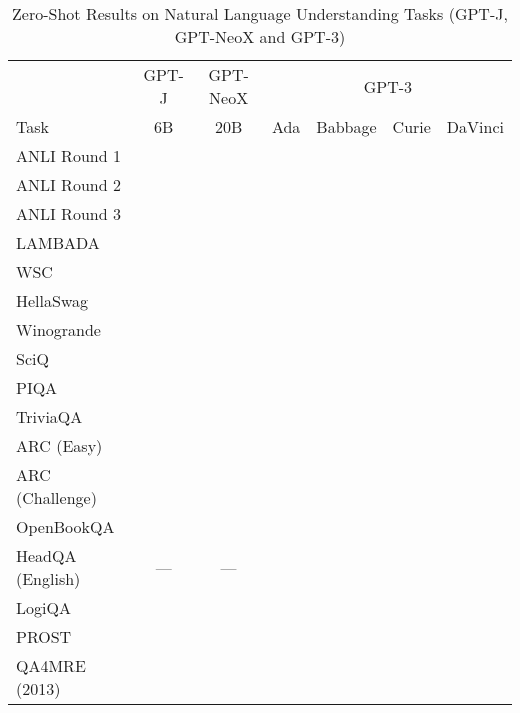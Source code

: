\documentclass[11pt]{article}
\begin{document}
{\onecolumn
\begin{landscape}
\begin{table*}    
\centering \begin{tabular}{l c c c c c c }
 & GPT-J & GPT-NeoX & \multicolumn{4}{c}{GPT-3} \\
Task & 6B & 20B & Ada & Babbage & Curie & DaVinci\\ \toprule
ANLI Round 1 &  &  &  &  &  &  \\ 
ANLI Round 2 &  &  &  &  &  &  \\ 
ANLI Round 3 &  &  &  &  &  &  \\ 
LAMBADA &  &  &  &  &  &  \\ 
WSC &  &  &  &  &  &  \\ 
HellaSwag &  &  &  &  &  &  \\ 
Winogrande &  &  &  &  &  &  \\ 
SciQ &  &  &  &  &  &  \\ 
PIQA &  &  &  &  &  &  \\ 
TriviaQA &  &  &  &  &  &  \\ 
ARC (Easy) &  &  &  &  &  &  \\ 
ARC (Challenge) &  &  &  &  &  &  \\ 
OpenBookQA &  &  &  &  &  &  \\ 
HeadQA (English) & --- & --- &  &  &  &  \\ 
LogiQA &  &  &  &  &  &  \\ 
PROST &  &  &  &  &  &  \\ 
QA4MRE (2013) &  &  &  &  &  &  \\ \bottomrule
\end{tabular}
\caption{Zero-Shot Results on Natural Language Understanding Tasks (GPT-J, GPT-NeoX and GPT-3)}
\label{tab:nlu_gpt}
\end{table*}


\end{landscape}}
\end{document}
